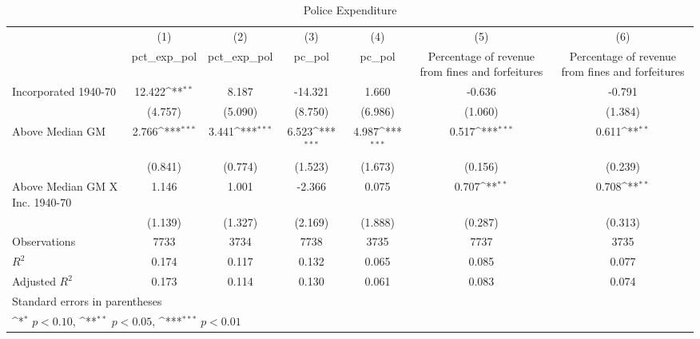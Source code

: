 \begin{table}[htbp]\centering
\def\sym#1{\ifmmode^{#1}\else\(^{#1}\)\fi}
\caption{Police Expenditure}
\begin{tabular}{l*{6}{c}}
\hline\hline
                    &\multicolumn{1}{c}{(1)}&\multicolumn{1}{c}{(2)}&\multicolumn{1}{c}{(3)}&\multicolumn{1}{c}{(4)}&\multicolumn{1}{c}{(5)}&\multicolumn{1}{c}{(6)}\\
                    &\multicolumn{1}{c}{pct\_exp\_pol}&\multicolumn{1}{c}{pct\_exp\_pol}&\multicolumn{1}{c}{pc\_pol}&\multicolumn{1}{c}{pc\_pol}&\multicolumn{1}{c}{Percentage of revenue from fines and forfeitures}&\multicolumn{1}{c}{Percentage of revenue from fines and forfeitures}\\
\hline
Incorporated 1940-70&      12.422\sym{**} &       8.187         &     -14.321         &       1.660         &      -0.636         &      -0.791         \\
                    &     (4.757)         &     (5.090)         &     (8.750)         &     (6.986)         &     (1.060)         &     (1.384)         \\
[1em]
Above Median GM     &       2.766\sym{***}&       3.441\sym{***}&       6.523\sym{***}&       4.987\sym{***}&       0.517\sym{***}&       0.611\sym{**} \\
                    &     (0.841)         &     (0.774)         &     (1.523)         &     (1.673)         &     (0.156)         &     (0.239)         \\
[1em]
Above Median GM X Inc. 1940-70&       1.146         &       1.001         &      -2.366         &       0.075         &       0.707\sym{**} &       0.708\sym{**} \\
                    &     (1.139)         &     (1.327)         &     (2.169)         &     (1.888)         &     (0.287)         &     (0.313)         \\
\hline
Observations        &        7733         &        3734         &        7738         &        3735         &        7737         &        3735         \\
\(R^{2}\)           &       0.174         &       0.117         &       0.132         &       0.065         &       0.085         &       0.077         \\
Adjusted \(R^{2}\)  &       0.173         &       0.114         &       0.130         &       0.061         &       0.083         &       0.074         \\
\hline\hline
\multicolumn{7}{l}{\footnotesize Standard errors in parentheses}\\
\multicolumn{7}{l}{\footnotesize \sym{*} \(p<0.10\), \sym{**} \(p<0.05\), \sym{***} \(p<0.01\)}\\
\end{tabular}
\end{table}
